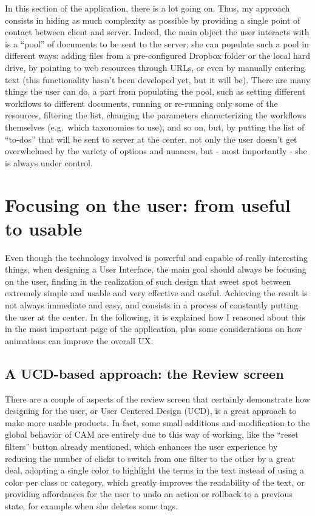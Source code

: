 \documentclass[12pt,svgnames]{memoir}
\begin{document}
In this section of the application, there is a lot going on. Thus, my
approach consists in hiding as much complexity as possible by providing
a single point of contact between client and server. Indeed, the main
object the user interacts with is a ``pool'' of documents to be sent to
the server; she can populate such a pool in different ways: adding files
from a pre-configured Dropbox folder or the local hard drive, by
pointing to web resources through URLs, or even by manually entering
text (this functionality hasn't been developed yet, but it will be).
There are many things the user can do, a part from populating the pool,
such as setting different workflows to different documents, running or
re-running only some of the resources, filtering the list, changing the
parameters characterizing the workflows themselves (e.g.~which
taxonomies to use), and so on, but, by putting the list of ``to-dos''
that will be sent to server at the center, not only the user doesn't get
overwhelmed by the variety of options and nuances, but - most
importantly - she is always under control.

\chapter{Focusing on the user: from useful to
usable}\label{focusing-on-the-user-from-useful-to-usable}

Even though the technology involved is powerful and capable of really
interesting things, when designing a User Interface, the main goal
should always be focusing on the user, finding in the realization of
such design that sweet spot between extremely simple and usable and very
effective and useful. Achieving the result is not always immediate and
easy, and consists in a process of constantly putting the user at the
center. In the following, it is explained how I reasoned about this in
the most important page of the application, plus some considerations on
how animations can improve the overall UX.

\section{A UCD-based approach: the Review
screen}\label{a-ucd-based-approach-the-review-screen}

There are a couple of aspects of the review screen that certainly
demonstrate how designing for the user, or User Centered Design (UCD),
is a great approach to make more usable products. In fact, some small
additions and modification to the global behavior of CAM are entirely
due to this way of working, like the ``reset filters'' button already
mentioned, which enhances the user experience by reducing the number of
clicks to switch from one filter to the other by a great deal, adopting
a single color to highlight the terms in the text instead of using a
color per class or category, which greatly improves the readability of
the text, or providing affordances for the user to undo an action or
rollback to a previous state, for example when she deletes some tags.
\end{document}

